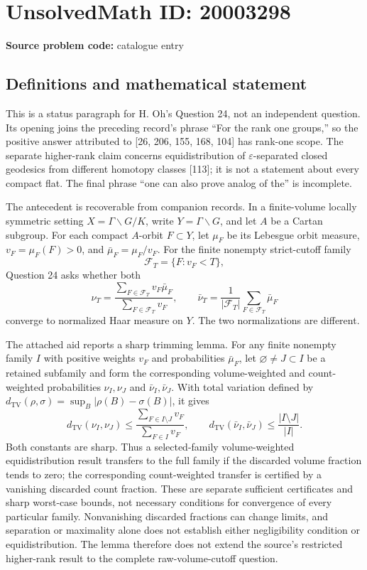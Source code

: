 \documentclass[11pt]{article}
\begin{document}
\section*{UnsolvedMath ID: 20003298}
\textbf{Source problem code:} catalogue entry
\subsection{Definitions and mathematical statement}
This is a status paragraph for H. Oh's Question 24, not an independent question. Its opening joins the preceding record's phrase ``For the rank one groups,'' so the positive answer attributed to [26, 206, 155, 168, 104] has rank-one scope. The separate higher-rank claim concerns equidistribution of $\varepsilon$-separated closed geodesics from different homotopy classes [113]; it is not a statement about every compact flat. The final phrase ``one can also prove analog of the'' is incomplete.

The antecedent is recoverable from companion records. In a finite-volume locally symmetric setting $X=\Gamma\backslash G/K$, write $Y=\Gamma\backslash G$, and let $A$ be a Cartan subgroup. For each compact $A$-orbit $F\subset Y$, let $\mu_F$ be its Lebesgue orbit measure, $v_F=\mu_F(F)>0$, and $\bar\mu_F=\mu_F/v_F$. For the finite nonempty strict-cutoff family
\[
 \mathcal F_T=\{F:v_F<T\},
\]
Question 24 asks whether both
\[
 \nu_T=\frac{\sum_{F\in\mathcal F_T}v_F\bar\mu_F}
                  {\sum_{F\in\mathcal F_T}v_F},\qquad
 \bar\nu_T=\frac1{|\mathcal F_T|}\sum_{F\in\mathcal F_T}\bar\mu_F
\]
converge to normalized Haar measure on $Y$. The two normalizations are different.

The attached aid reports a sharp trimming lemma. For any finite nonempty family $I$ with positive weights $v_F$ and probabilities $\bar\mu_F$, let $\varnothing\ne J\subset I$ be a retained subfamily and form the corresponding volume-weighted and count-weighted probabilities $\nu_I,\nu_J$ and $\bar\nu_I,\bar\nu_J$. With total variation defined by $d_{\mathrm{TV}}(\rho,\sigma)=\sup_B|\rho(B)-\sigma(B)|$, it gives
\[
 d_{\mathrm{TV}}(\nu_I,\nu_J)
 \le\frac{\sum_{F\in I\setminus J}v_F}{\sum_{F\in I}v_F},\qquad
 d_{\mathrm{TV}}(\bar\nu_I,\bar\nu_J)
 \le\frac{|I\setminus J|}{|I|}.
\]
Both constants are sharp. Thus a selected-family volume-weighted equidistribution result transfers to the full family if the discarded volume fraction tends to zero; the corresponding count-weighted transfer is certified by a vanishing discarded count fraction. These are separate sufficient certificates and sharp worst-case bounds, not necessary conditions for convergence of every particular family. Nonvanishing discarded fractions can change limits, and separation or maximality alone does not establish either negligibility condition or equidistribution. The lemma therefore does not extend the source's restricted higher-rank result to the complete raw-volume-cutoff question.
\end{document}
